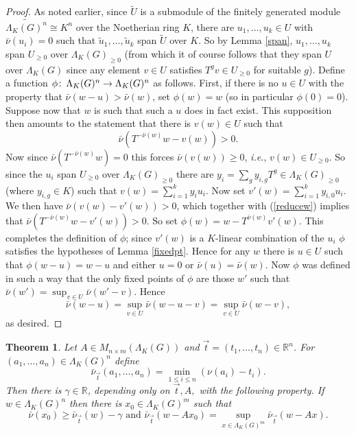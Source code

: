 \documentclass{amsart}
\theoremstyle{plain}
\newtheorem{theorem}{Theorem}[section]
\theoremstyle{definition}
\theoremstyle{remark}
\def\co{\colon\thinspace}
\def\barnu{\bar{\nu}}
\begin{document}
\begin{proof} As noted earlier, since $\tilde{U}$ is a submodule of the finitely generated module $\widetilde{\Lambda_K(G)^n}\cong K^n$ over the Noetherian ring $K$, there are $u_1,\ldots,u_k\in U$ with $\barnu(u_i)=0$ such that $\tilde{u}_1,\ldots,\tilde{u}_k$ span $\tilde{U}$ over $K$.  So by Lemma \ref{span}, $u_1,\ldots,u_k$ span $U_{\geq 0}$ over $\Lambda_K(G)_{\geq 0}$ (from which it of course follows that they span $U$ over $\Lambda_K(G)$ since any element $v\in U$ satisfies $T^gv\in U_{\geq 0}$ for suitable $g$).  Define a function $\phi\co \Lambda_K(G)^n\to\Lambda_K(G)^n$ as follows.  First, if there is no $u\in U$ with the property that $\barnu(w-u)>\barnu(w)$, set $\phi(w)=w$  (so in particular $\phi(0)=0$).  Suppose now that $w$ is such that such a $u$ does in fact exist. 
 This supposition then amounts to the statement that there is $v(w)\in U$ such that \begin{equation}\label{reducew} \barnu(T^{-\barnu(w)}w-v(w))>0.\end{equation}  Now since $\barnu(T^{-\barnu(w)}w)=0$ this forces $\barnu(v(w))\geq 0$, \emph{i.e.}, $v(w)\in U_{\geq 0}$.  So since the $u_i$ span $U_{\geq 0}$ over $\Lambda_K(G)_{\geq 0}$ there are $y_i=\sum_g y_{i,g}T^g\in \Lambda_K(G)_{\geq 0}$ (where $y_{i,g}\in K$) such that $v(w)=\sum_{i=1}^{k}y_iu_i$.  Now set $v'(w)=\sum_{i=1}^{k}y_{i,0}u_i$.  We then have $\barnu(v(w)-v'(w))>0$, which together with (\ref{reducew}) implies that $\barnu(T^{-\barnu(w)}w-v'(w))>0$.  So set $\phi(w)=w-T^{\barnu(w)}v'(w)$.  This completes the definition of $\phi$; since $v'(w)$ is a $K$-linear combination of the $u_i$ $\phi$ satisfies the hypotheses of Lemma \ref{fixedpt}.  Hence for any $w$ there is $u\in U$ such that $\phi(w-u)=w-u$ and either $u=0$ or $\barnu(u)=\barnu(w)$.  Now $\phi$ was defined in such a way that the only fixed points of $\phi$ are those $w'$ such that $\barnu(w')=\sup_{v\in U}\barnu(w'-v)$.  Hence \[ \barnu(w-u)=\sup_{v\in U}\barnu(w-u-v)=\sup_{v\in U}\barnu(w-v),\] as desired.
\end{proof}

\begin{theorem} \label{alg}  Let $A\in M_{n\times m}(\Lambda_K(G))$ and $\vec{t}=(t_1,\ldots,t_n)\in \mathbb{R}^n$.  For $(a_1,\ldots,a_n)\in \Lambda_K(G)^n $
define \[ \barnu_{\vec{t}}(a_1,\ldots,a_n)=\min_{1\leq i\leq n}(\nu(a_i)-t_i).\]  Then there is $\gamma\in\mathbb{R}$, depending only on $\vec{t},A,$ with the following property.  If $w\in \Lambda_K(G)^n$ then there is $x_0\in \Lambda_K(G)^m$ such that \[ \barnu(x_0)\geq \barnu_{\vec{t}}(w)-\gamma\mbox{  and  } \barnu_{\vec{t}}(w-Ax_0)=\sup_{x\in \Lambda_K(G)^m}\barnu_{\vec{t}}(w-Ax).\]
\end{theorem}
\end{document}
